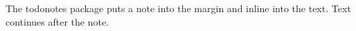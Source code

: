 \documentclass[11pt]{article}\usepackage[paperwidth=14cm,paperheight=7cm,left=1cm,right=3.6cm,top=1cm,bottom=1cm,marginparwidth=2.6cm,marginparsep=3mm]{geometry}\pagestyle{empty}\usepackage{lipsum}
\begin{document}
The todonotes package puts a note into the margin and inline into the text.
Text continues after the note.
\end{document}
